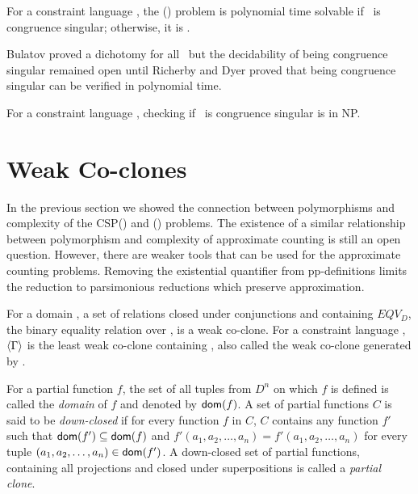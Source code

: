\begin{theorem}
For a constraint language \mrelset,
the \ccsp(\mrelset) problem is polynomial time solvable if 
\mrelset\ is congruence singular; otherwise, it is \cpc\@.
\end{theorem}

Bulatov proved a dichotomy for all \mrelset\ but the decidability of being congruence
singular remained open until Richerby and Dyer \cite{DyerR10} 
proved that being congruence singular can be verified in polynomial time.

\begin{theorem} 
For a constraint language \mrelset, checking if \mrelset\ is congruence singular is in NP.
\end{theorem}

\section{Weak Co-clones}
In the previous section we showed the connection between polymorphisms and complexity 
of the CSP(\mrelset) and \ccsp(\mrelset) problems. The existence of a similar relationship
between polymorphism and complexity of approximate counting is still an open
question. However, there are weaker tools that can be used for the approximate counting
problems. Removing the existential quantifier from pp-definitions limits the 
reduction to parsimonious reductions which preserve approximation.


For a domain \mD, a set of relations closed under conjunctions and
containing \(EQV_D\), the binary equality relation over \mD,
is a weak co-clone. For a constraint language \mrelset, 
\(\langle \Gamma \rangle\) is the least weak co-clone containing \mrelset,
also called the weak co-clone generated by \mrelset\@.

For a partial function \(f\), the set of all tuples from \(D^n\) on which \(f\) is
defined is called the \emph{domain} of \(f\) and denoted by \({\sf dom}(f)\).
A set of partial functions \(C\) is said to be \emph{down-closed} if
for every function \(f\) in \(C\), \(C\) contains any function \(f'\) such that \({\sf dom}(f')\subseteq{\sf dom}(f)\) and \(f'(a_1,a_2,\dotsc,a_n)=f'(a_1,a_2,\dotsc,a_n)\)
for every tuple \((a_1,a_2,\dotsc,a_n)\in {\sf dom}(f')\)\@.
A down-closed set of partial functions, 
containing all projections and closed under 
superpositions is called a \emph{partial clone}. 


